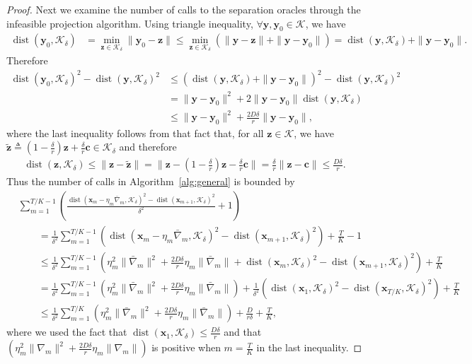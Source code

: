 \documentclass[twoside,11pt,]{article}
\newcommand{\op}[1]{\operatorname{#1}}
\newcommand{\C}[1]{\mathcal{#1}}
\newcommand{\BF}[1]{\mathbf{#1}}
\newcommand{\K}{\C{K}}
\newcommand{\x}{\BF{x}}
\newcommand{\y}{\BF{y}}
\newcommand{\z}{\BF{z}}
\newcommand{\bn}{\bar{\nabla}}
\begin{document}
\begin{proof}
Next we examine the number of calls to the separation oracles through the infeasible projection algorithm.
Using triangle inequality, $\forall \y, \y_0 \in \K$, we have
\begin{align*}
\op{dist}(\y_0,\K_\delta)
&= \min_{\z \in \K_\delta} \| \y_0 - \z \|
\leq \min_{\z \in \K_\delta} \left( \| \y - \z \| + \| \y  - \y_0 \| \right) 
= \op{dist}(\y,\K_\delta) + \| \y  - \y_0 \|.
\end{align*}
Therefore
\begin{align*}
\op{dist}(\y_0,\K_\delta)^2 - \op{dist}(\y,\K_\delta)^2
&\leq \left( \op{dist}(\y,\K_\delta) + \| \y  - \y_0 \| \right)^2 - \op{dist}(\y,\K_\delta)^2 \\
&= \| \y  - \y_0 \|^2 + 2 \| \y  - \y_0 \| \op{dist}(\y,\K_\delta) \\
&\leq \| \y  - \y_0 \|^2 + \frac{2 D \delta}{r} \| \y  - \y_0 \|,
\end{align*}
where the last inequality follows from that fact that, for all $\z \in \K$, we have $\tilde{\z} \triangleq (1-\frac{\delta}{r})\z+\frac{\delta}{r}{\BF{c}} \in \K_\delta$ and therefore
\begin{align*}
\op{dist}(\z,\K_\delta)
\leq \| \z - \tilde{\z} \|
= \| \z - (1-\frac{\delta}{r})\z-\frac{\delta}{r}{\BF{c}} \|
= \frac{\delta}{r} \| \z- \BF{c} \|
\leq \frac{D \delta}{r}.
\end{align*}
Thus the number of calls in Algorithm~\ref{alg:general} is bounded by
\begin{align}
\label{eq:oracle-calls}
&\sum_{m = 1}^{T/K - 1}\left( \frac{\op{dist}(\x_m - \eta_m \bn_m,\K_\delta)^2-\op{dist}(\x_{m+1},\K_\delta)^2 }{\delta^2}+1 \right) \nonumber \\
&\qquad= \frac{1}{\delta^2} \sum_{m = 1}^{T/K - 1}\left( \op{dist}(\x_m - \eta_m \bn_m,\K_\delta)^2-\op{dist}(\x_{m+1},\K_\delta)^2 \right)
+ \frac{T}{K} - 1 \nonumber \\
&\qquad\leq \frac{1}{\delta^2} \sum_{m = 1}^{T/K - 1}\left( \eta_m^2 \| \bn_m \|^2 + \frac{2 D \delta}{r} \eta_m \| \bn_m \| + \op{dist}(\x_m, \K_\delta)^2-\op{dist}(\x_{m+1},\K_\delta)^2 \right)
+ \frac{T}{K} \nonumber \\
&\qquad= \frac{1}{\delta^2} \sum_{m = 1}^{T/K - 1} \left( \eta_m^2 \| \bn_m \|^2 + \frac{2 D \delta}{r} \eta_m \| \bn_m \| \right)
+ \frac{1}{\delta^2} \left( \op{dist}(\x_1,\K_\delta)^2-\op{dist}(\x_{T/K},\K_\delta)^2 \right)
+ \frac{T}{K} \nonumber \\
&\qquad\leq \frac{1}{\delta^2} \sum_{m = 1}^{T/K} \left( \eta_m^2 \| \bn_m \|^2 + \frac{2 D \delta}{r} \eta_m \| \bn_m \| \right)
+ \frac{D}{r \delta} 
+ \frac{T}{K},
\end{align}
where we used the fact that $\op{dist}(\x_1,\K_\delta) \leq \frac{D \delta}{r}$ and that $\left( \eta_m^2 \| \nabla_m \|^2 + \frac{2 D \delta}{r} \eta_m \| \nabla_m \| \right)$ is positive when $m=\frac{T}{K}$ in the last inequality.


\end{proof}
\end{document}
